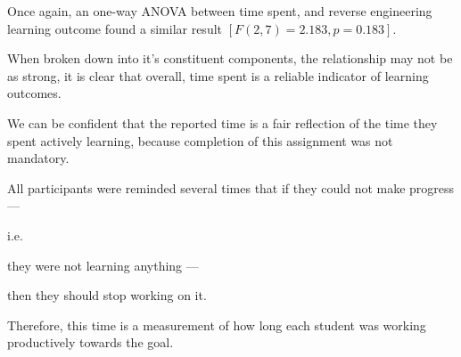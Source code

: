 Once again, an one-way ANOVA between time spent, and reverse engineering learning outcome found a similar result $[F(2, 7)=2.183, p=0.183]$. 















        When broken down into it's constituent components, the relationship may not be as strong, it is clear that overall, time spent is a reliable indicator of learning outcomes.















        We can be confident that the reported time is a fair reflection of the time they spent actively learning, because completion of this assignment was not mandatory. %







All participants were reminded several times that if they could not make progress ---%







 i.e. %







they were not learning anything ---%







 then they should stop working on it. %







Therefore, this time is a measurement of how long each student was working productively towards the goal. 















